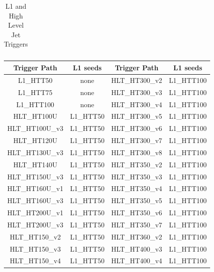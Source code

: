 \begin{table}[th]
\begin{tabular}{|c|c||c|c|}
  \end{tabular}
  \caption{L1 and High Level Jet Triggers}
  \label{table:HLTdescriptions_Jet}
\end{table}

\begin{table}[th]
  \centering
  \normalsize
  \begin{tabular}{|c|c||c|c|}
    \hline
    Trigger Path     & L1 seeds          & Trigger Path    & L1 seeds        \\
    \hline 
    \hline
    L1\_HTT50        & none              & HLT\_HT300\_v2  & L1\_HTT100      \\
    \hline
    L1\_HTT75        & none              & HLT\_HT300\_v3  & L1\_HTT100      \\
    \hline
    L1\_HTT100       & none              & HLT\_HT300\_v4  & L1\_HTT100      \\
    \hline
    HLT\_HT100U      & L1\_HTT50         & HLT\_HT300\_v5  & L1\_HTT100      \\
    \hline
    HLT\_HT100U\_v3  & L1\_HTT50         & HLT\_HT300\_v6  & L1\_HTT100      \\
    \hline
    HLT\_HT120U      & L1\_HTT50         & HLT\_HT300\_v7  & L1\_HTT100      \\
    \hline
    HLT\_HT130U\_v3  & L1\_HTT50         & HLT\_HT300\_v8  & L1\_HTT100      \\
    \hline
    HLT\_HT140U      & L1\_HTT50         & HLT\_HT350\_v2  & L1\_HTT100      \\
    \hline
    HLT\_HT150U\_v3  & L1\_HTT50         & HLT\_HT350\_v3  & L1\_HTT100      \\
    \hline
    HLT\_HT160U\_v1  & L1\_HTT50         & HLT\_HT350\_v4  & L1\_HTT100      \\
    \hline
    HLT\_HT160U\_v3  & L1\_HTT50         & HLT\_HT350\_v5  & L1\_HTT100      \\
    \hline
    HLT\_HT200U\_v1  & L1\_HTT50         & HLT\_HT350\_v6  & L1\_HTT100      \\
    \hline
    HLT\_HT200U\_v3  & L1\_HTT50         & HLT\_HT350\_v7  & L1\_HTT100      \\
    \hline
    HLT\_HT150\_v2   & L1\_HTT50         & HLT\_HT360\_v2  & L1\_HTT100      \\
    \hline
    HLT\_HT150\_v3   & L1\_HTT50         & HLT\_HT400\_v3  & L1\_HTT100      \\
    \hline
    HLT\_HT150\_v4   & L1\_HTT50         & HLT\_HT400\_v4  & L1\_HTT100      \\

\end{tabular}
\end{table}
